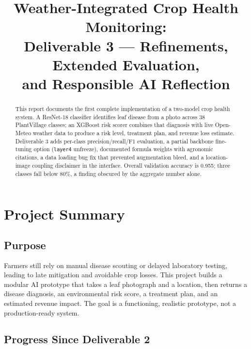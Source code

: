 \documentclass[conference]{IEEEtran}
\let\oldtexttt\texttt
\renewcommand{\texttt}[1]{{\small\oldtexttt{#1}}}
\begin{document}
\title{Weather-Integrated Crop Health Monitoring:\\
Deliverable 3 --- Refinements, Extended Evaluation,\\
and Responsible AI Reflection}

\author{
}

\maketitle

\begin{abstract}
This report documents the first complete implementation of a two-model crop health system. A ResNet-18 classifier identifies leaf disease from a photo across 38 PlantVillage classes; an XGBoost risk scorer combines that diagnosis with live Open-Meteo weather data to produce a risk level, treatment plan, and revenue loss estimate. Deliverable 3 adds per-class precision/recall/F1 evaluation, a partial backbone fine-tuning option (\texttt{layer4} unfreeze), documented formula weights with agronomic citations, a data loading bug fix that prevented augmentation bleed, and a location-image coupling disclaimer in the interface. Overall validation accuracy is 0.955; three classes fall below 80\%, a finding obscured by the aggregate number alone.
\end{abstract}

\section{Project Summary}

\subsection{Purpose}

Farmers still rely on manual disease scouting or delayed laboratory testing, leading to late mitigation and avoidable crop losses. This project builds a modular AI prototype that takes a leaf photograph and a location, then returns a disease diagnosis, an environmental risk score, a treatment plan, and an estimated revenue impact. The goal is a functioning, realistic prototype, not a production-ready system.

\subsection{Progress Since Deliverable 2}
\end{document}
